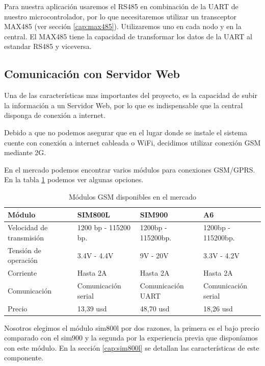 Para nuestra aplicación usaremos el RS485 en combinación de la UART de nuestro microcontrolador, por lo que necesitaremos utilizar un transceptor MAX485 
(ver sección \ref{cap:max485}). Utilizaremos uno en cada nodo y en la central. El MAX485 tiene la capacidad de transformar los datos de la UART al estandar
RS485 y viceversa. \par

\subsection{Comunicación con Servidor Web}

Una de las características mas importantes del proyecto, es la capacidad de subir la información a un Servidor Web, por lo que es indispensable que la central disponga
de conexión a internet.\par
Debido a que no podemos asegurar que en el lugar donde se instale el sistema cuente con conexión a internet cableada o WiFi, decidimos utilizar conexión GSM mediante 2G. \par
En el mercado podemos encontrar varios módulos para conexiones GSM/GPRS. En la tabla \ref{tab:gsm} podemos ver algunas opciones.

\begin{table}[t]
    \begin{center}
        \begin{tabular}{ | m{3cm} | m{3cm} | m{3cm} | m{3cm} | }
        \hline Módulo & SIM800L & SIM900 & A6  \\ \hline
        Velocidad de transmisión & 1200 bp - 115200 bp. & 1200bp - 115200bp. & 1200bp - 115200bp. \\ \hline
        Tensión de operación & 3.4V - 4.4V & 9V - 20V & 3.3V - 4.2V \\ \hline
        Corriente & Hasta 2A & Hasta 2A & Hasta 2A\\ \hline
        Comunicación & Comunicación serial &Comunicación UART & Comunicación serial\\ \hline
        Precio & 13,39 usd &  48,70 usd & 18,26 usd\\ \hline
        
        \end{tabular}
        \caption{Módulos GSM disponibles en el mercado}
        \label{tab:gsm}   
    \end{center}
\end{table}

Nosotros elegimos el módulo sim800l por dos razones, la primera es el bajo precio comparado con el sim900 y la segunda por la experiencia previa
que disponíamos con este módulo.
En la sección \ref{cap:sim800l} se detallan las características de este componente.

